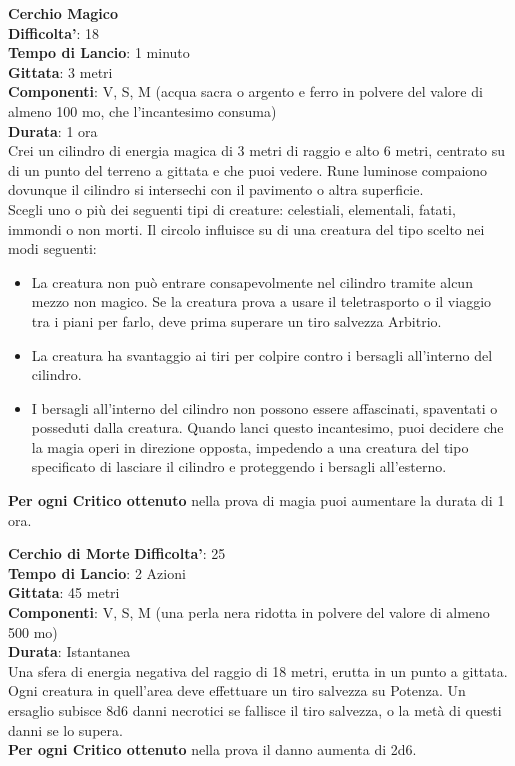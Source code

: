 \begin{multicols}{2}
\medskip\textbf{Cerchio Magico}\\
\textbf{Difficolta'}: 18\\
\textbf{Tempo di Lancio}: 1 minuto\\
\textbf{Gittata}: 3 metri\\
\textbf{Componenti}: V, S, M (acqua sacra o argento e ferro in polvere del valore di almeno 100 mo, che l’incantesimo consuma)\\
\textbf{Durata}: 1 ora\\
Crei un cilindro di energia magica di 3 metri di raggio e alto 6 metri, centrato su di un punto del terreno a gittata e che puoi vedere. Rune luminose compaiono dovunque il cilindro si intersechi con il pavimento o altra superficie.\\
Scegli uno o più dei seguenti tipi di creature: celestiali, elementali, fatati, immondi o non morti. Il circolo influisce su di una creatura del tipo scelto nei modi seguenti:\\
\begin{itemize}
	\item 
La creatura non può entrare consapevolmente nel cilindro tramite alcun mezzo non magico. Se la creatura prova a usare il teletrasporto o il viaggio tra i piani per farlo, deve prima superare un tiro salvezza Arbitrio.
	\item 
La creatura ha svantaggio ai tiri per colpire contro i bersagli all’interno del cilindro.
	\item 
I bersagli all’interno del cilindro non possono essere affascinati, spaventati o posseduti dalla creatura. Quando lanci questo incantesimo, puoi decidere che la magia operi in direzione opposta, impedendo a una creatura del tipo specificato di lasciare il cilindro e proteggendo i bersagli all’esterno.
\end{itemize}
\textbf{Per ogni Critico ottenuto} nella prova di magia puoi aumentare la durata di 1 ora.

\medskip\textbf{Cerchio di Morte}
\textbf{Difficolta'}: 25\\
\textbf{Tempo di Lancio}: 2 Azioni\\
\textbf{Gittata}: 45 metri\\
\textbf{Componenti}: V, S, M (una perla nera ridotta in polvere del valore di almeno 500 mo)\\
\textbf{Durata}: Istantanea\\
Una sfera di energia negativa del raggio di 18 metri, erutta in un punto a gittata. Ogni creatura in quell’area deve effettuare un tiro salvezza su Potenza. Un  ersaglio subisce 8d6 danni necrotici se fallisce il tiro salvezza, o la metà di questi danni se lo supera. \\
\textbf{Per ogni Critico ottenuto} nella prova il danno aumenta di 2d6.


\end{multicols}

